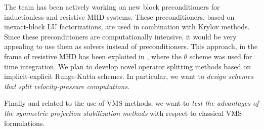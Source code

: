 The team has been actively working on new block preconditioners for inductionless and resistive MHD systems. These preconditioners, based on inexact-block LU factorizations, are used in combination with Krylov methods. Since these preconditioners are computationally intensive, it would be very appealing to use them as solvers instead of preconditioners. This approach, in the frame of resistive MHD has been exploited in \cite{badia_unconditionally_2012}, where the $\theta$ scheme was used for time integration. We plan to develop novel operator splitting methods based on implicit-explicit Runge-Kutta schemes. In particular, we want to \emph{design schemes that split velocity-pressure computations}.

Finally and related to the use of VMS methods, we want to \emph{test the advantages of the symmetric projection stabilization methods} with respect to classical VMS formulations.
%
%
